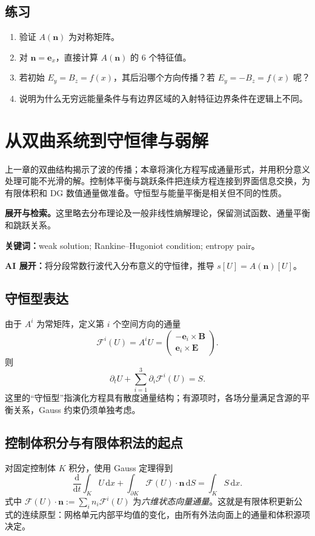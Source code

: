 \documentclass[UTF8,11pt,openany]{ctexbook}
\numberwithin{equation}{chapter}
\theoremstyle{definition}
\theoremstyle{remark}
\newcommand{\dd}{\mathrm d}
\newcommand{\mat}[1]{\begin{pmatrix}#1\end{pmatrix}}
\newcommand{\studyroute}[3]{%
  \par\smallskip\noindent\textbf{展开与检索。}#1\par
  \noindent\textbf{关键词：}#2。\par
  \noindent\textbf{AI 展开：}#3\par
}
\begin{document}
\section{练习}
\begin{enumerate}
\item 验证 $A(\bm n)$ 为对称矩阵。
\item 对 $\bm n=\bm e_x$，直接计算 $A(\bm n)$ 的 6 个特征值。
\item 若初始 $E_y=B_z=f(x)$，其后沿哪个方向传播？若 $E_y=-B_z=f(x)$ 呢？
\item 说明为什么无穷远能量条件与有边界区域的入射特征边界条件在逻辑上不同。
\end{enumerate}

\chapter{从双曲系统到守恒律与弱解}
\label{ch:conservation}
\begin{chaptersummary}
上一章的双曲结构揭示了波的传播；本章将演化方程写成通量形式，并用积分意义处理可能不光滑的解。控制体平衡与跳跃条件把连续方程连接到界面信息交换，为有限体积和 DG 数值通量做准备。守恒型与能量平衡是相关但不同的性质。
\end{chaptersummary}
\studyroute{这里略去分布理论及一般非线性熵解理论，保留测试函数、通量平衡和跳跃关系。}{weak solution; Rankine--Hugoniot condition; entropy pair}{将分段常数行波代入分布意义的守恒律，推导 $s[U]=A(\bm n)[U]$。}
\section{守恒型表达}
由于 $A^i$ 为常矩阵，定义第 $i$ 个空间方向的通量
\begin{equation}\label{eq:flux}
\mathcal F^i(U)=A^iU
=\mat{-\bm e_i\times\bm B\\ \bm e_i\times\bm E}.
\end{equation}
则
\begin{equation}\label{eq:conservation}
\boxed{\partial_tU+\sum_{i=1}^3\partial_i\mathcal F^i(U)=S.}
\end{equation}
这里的“守恒型”指演化方程具有散度通量结构；有源项时，各场分量满足含源的平衡关系，Gauss 约束仍须单独考虑。

\section{控制体积分与有限体积法的起点}
对固定控制体 $K$ 积分，使用 Gauss 定理得到
\begin{equation}\label{eq:finitevolumeintegral}
\frac{\dd}{\dd t}\int_K U\,\dd x
+\int_{\partial K}\mathcal F(U)\cdot\bm n\,\dd S
=\int_KS\,\dd x.
\end{equation}
式中 $\mathcal F(U)\cdot\bm n:=\sum_i n_i\mathcal F^i(U)$ 为\emph{六维状态向量通量}。这就是有限体积更新公式的连续原型：网格单元内部平均值的变化，由所有外法向面上的通量和体积源项决定。
\end{document}

